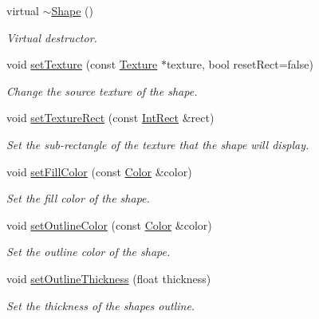 \begin{DoxyCompactItemize}
\item 
\mbox{\label{classsf_1_1_shape_a2262aceb9df52d4275c19633592f19bf}} 
virtual \hyperlink{classsf_1_1_shape_a2262aceb9df52d4275c19633592f19bf}{$\sim$\+Shape} ()
\begin{DoxyCompactList}\small\item\em Virtual destructor. \end{DoxyCompactList}\item 
void \hyperlink{classsf_1_1_shape_af8fb22bab1956325be5d62282711e3b6}{set\+Texture} (const \hyperlink{classsf_1_1_texture}{Texture} $\ast$texture, bool reset\+Rect=false)
\begin{DoxyCompactList}\small\item\em Change the source texture of the shape. \end{DoxyCompactList}\item 
void \hyperlink{classsf_1_1_shape_a2029cc820d1740d14ac794b82525e157}{set\+Texture\+Rect} (const \hyperlink{classsf_1_1_rect}{Int\+Rect} \&rect)
\begin{DoxyCompactList}\small\item\em Set the sub-\/rectangle of the texture that the shape will display. \end{DoxyCompactList}\item 
void \hyperlink{classsf_1_1_shape_a3506f9b5d916fec14d583d16f23c2485}{set\+Fill\+Color} (const \hyperlink{classsf_1_1_color}{Color} \&color)
\begin{DoxyCompactList}\small\item\em Set the fill color of the shape. \end{DoxyCompactList}\item 
void \hyperlink{classsf_1_1_shape_a5978f41ee349ac3c52942996dcb184f7}{set\+Outline\+Color} (const \hyperlink{classsf_1_1_color}{Color} \&color)
\begin{DoxyCompactList}\small\item\em Set the outline color of the shape. \end{DoxyCompactList}\item 
void \hyperlink{classsf_1_1_shape_a5ad336ad74fc1f567fce3b7e44cf87dc}{set\+Outline\+Thickness} (float thickness)
\begin{DoxyCompactList}\small\item\em Set the thickness of the shape\textquotesingle{}s outline. \end{DoxyCompactList}\item 

\end{DoxyCompactItemize}
